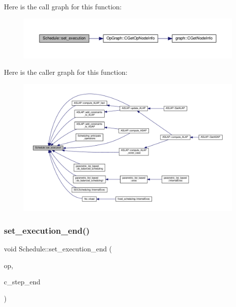 Here is the call graph for this function\+:
\nopagebreak
\begin{figure}[H]
\begin{center}
\leavevmode
\includegraphics[width=350pt]{df/d61/classSchedule_a1bf4292733805b6e305ec28395cd04d0_cgraph}
\end{center}
\end{figure}
Here is the caller graph for this function\+:
\nopagebreak
\begin{figure}[H]
\begin{center}
\leavevmode
\includegraphics[width=350pt]{df/d61/classSchedule_a1bf4292733805b6e305ec28395cd04d0_icgraph}
\end{center}
\end{figure}
\mbox{\label{classSchedule_a1c75a65910f1d1b9cf3e9f27e91a756e}} 
\subsubsection{\texorpdfstring{set\+\_\+execution\+\_\+end()}{set\_execution\_end()}}
{\footnotesize\ttfamily void Schedule\+::set\+\_\+execution\+\_\+end (\begin{DoxyParamCaption}\item[{const \hyperlink{graph_8hpp_abefdcf0544e601805af44eca032cca14}{vertex} \&}]{op,  }\item[{Control\+Step}]{c\+\_\+step\+\_\+end }\end{DoxyParamCaption})}



